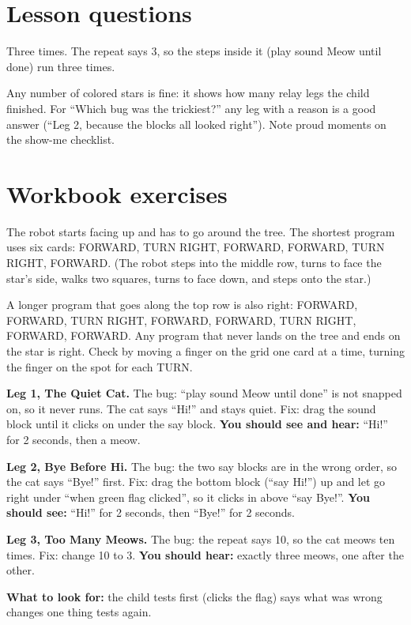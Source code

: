 
\section{Lesson questions}
\begin{answer}
Three times. The repeat says 3, so the steps inside it (play sound Meow until done) run three times.
\end{answer}

\begin{answer}[Reflection]
Any number of colored stars is fine: it shows how many relay legs the child finished. For \enquote{Which bug was the trickiest?} any leg with a reason is a good answer (\enquote{Leg 2, because the blocks all looked right}). Note proud moments on the show-me checklist.
\end{answer}

\section{Workbook exercises}
\begin{answer}
The robot starts facing up and has to go around the tree. The shortest program uses six cards:
FORWARD, TURN RIGHT, FORWARD, FORWARD, TURN RIGHT, FORWARD.
(The robot steps into the middle row, turns to face the star's side, walks two squares, turns to face down, and steps onto the star.)

A longer program that goes along the top row is also right: FORWARD, FORWARD, TURN RIGHT, FORWARD, FORWARD, TURN RIGHT, FORWARD, FORWARD. Any program that never lands on the tree and ends on the star is right. Check by moving a finger on the grid one card at a time, turning the finger on the spot for each TURN.
\end{answer}

\begin{answer}
\textbf{Leg 1, The Quiet Cat.} The bug: \enquote{play sound Meow until done} is not snapped on, so it never runs. The cat says \enquote{Hi!} and stays quiet. Fix: drag the sound block until it clicks on under the say block. \textbf{You should see and hear:} \enquote{Hi!} for 2 seconds, then a meow.

\textbf{Leg 2, Bye Before Hi.} The bug: the two say blocks are in the wrong order, so the cat says \enquote{Bye!} first. Fix: drag the bottom block (\enquote{say Hi!}) up and let go right under \enquote{when green flag clicked}, so it clicks in above \enquote{say Bye!}. \textbf{You should see:} \enquote{Hi!} for 2 seconds, then \enquote{Bye!} for 2 seconds.

\textbf{Leg 3, Too Many Meows.} The bug: the repeat says 10, so the cat meows ten times. Fix: change 10 to 3. \textbf{You should hear:} exactly three meows, one after the other.

\textbf{What to look for:} \tickbox{} the child tests first (clicks the flag) \quad \tickbox{} says what was wrong \quad \tickbox{} changes one thing \quad \tickbox{} tests again.
\end{answer}

